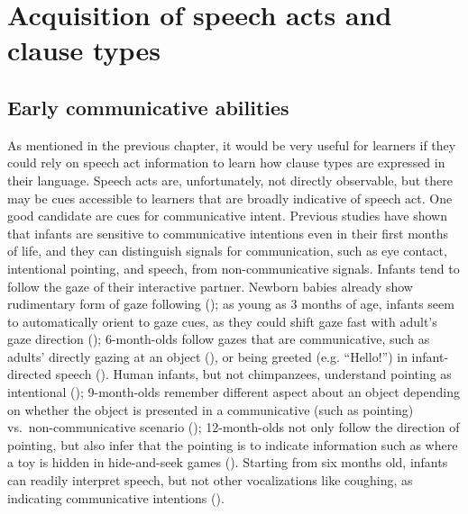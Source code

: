 
\section{Acquisition of speech acts and clause types}
\label{sec:bg:acq}
\subsection{Early communicative abilities}
\label{sec:bg:acq:pre}
As mentioned in the previous chapter, it would be very useful for learners if they could rely on speech act information to learn how clause types are expressed in their language. Speech acts are, unfortunately, not directly observable, but there may be cues accessible to learners that are broadly indicative of speech act. One good candidate are cues for communicative intent.
Previous studies have shown that infants are sensitive to %
communicative intentions even in their first months of life, and they can distinguish signals for communication, such as eye contact, intentional pointing, and speech, from non-communicative signals. Infants tend to follow the gaze of their interactive partner. Newborn babies already show rudimentary form of gaze following (\cite{farroni2004gaze}); as young as 3 months of age, infants seem to automatically orient to gaze cues, as they could shift gaze fast with adult’s gaze direction (\cite{hood1998gaze}); 6-month-olds follow gazes that are communicative, such as adults' directly gazing at an object (\cite{gredeback2008gaze}), or being greeted (e.g. ``Hello!'') in infant-directed speech (\cite{senju2008gaze}). Human infants, but not chimpanzees, understand pointing as intentional (\cite{pika2006point, povinelli1997point,morissette1995joint}); 9-month-olds remember different aspect about an object depending on whether the object is presented in a communicative (such as pointing) vs.\ non-communicative scenario (\cite{yoon2008intent}); 12-month-olds not only follow the direction of pointing, but also infer that the pointing is to indicate information such as where a toy is hidden in hide-and-seek games (\cite{behne2005hide,behne2012point}). Starting from six months old, infants can readily interpret speech, but not other vocalizations like coughing, as indicating communicative intentions (\cite{vouloumanos2014intent}).

